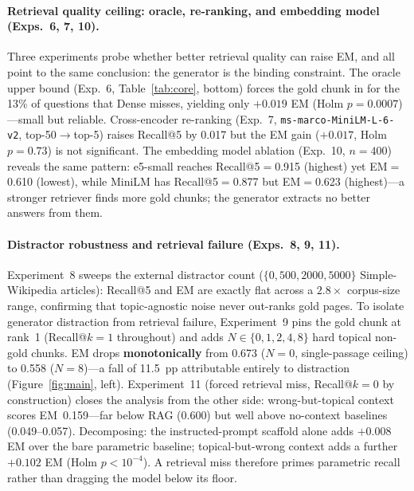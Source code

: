 \documentclass{article}
\begin{document}
\paragraph{Retrieval quality ceiling: oracle, re-ranking, and embedding model (Exps.\ 6, 7, 10).}
Three experiments probe whether better retrieval quality can raise EM,
and all point to the same conclusion: the generator is the binding
constraint.
The oracle upper bound (Exp.~6, Table~\ref{tab:core}, bottom) forces the
gold chunk in for the 13\% of questions that Dense misses, yielding
only $+0.019$ EM (Holm $p\!=\!0.0007$)---small but reliable.
Cross-encoder re-ranking (Exp.~7, \texttt{ms-marco-MiniLM-L-6-v2},
top-50$\to$top-5) raises Recall@5 by 0.017 but the EM gain ($+0.017$,
Holm $p\!=\!0.73$) is not significant.
The embedding model ablation (Exp.~10, $n\!=\!400$) reveals the same
pattern: e5-small reaches Recall@5$\!=\!$0.915 (highest) yet
EM$\!=\!$0.610 (lowest), while MiniLM has Recall@5$\!=\!$0.877 but
EM$\!=\!$0.623 (highest)---a stronger retriever finds more gold chunks;
the generator extracts no better answers from them.

\paragraph{Distractor robustness and retrieval failure (Exps.\ 8, 9, 11).}
Experiment~8 sweeps the external distractor count
($\{0, 500, 2000, 5000\}$ Simple-Wikipedia articles): Recall@5 and EM
are exactly flat across a $2.8\times$ corpus-size range, confirming
that topic-agnostic noise never out-ranks gold pages.
To isolate generator distraction from retrieval failure, Experiment~9
pins the gold chunk at rank~1 (Recall@$k\!=\!1$ throughout) and adds
$N\in\{0,1,2,4,8\}$ hard topical non-gold chunks.
EM drops \textbf{monotonically} from 0.673 ($N\!=\!0$, single-passage
ceiling) to 0.558 ($N\!=\!8$)---a fall of 11.5~pp attributable entirely
to distraction (Figure~\ref{fig:main}, left).
Experiment~11 (forced retrieval miss, Recall@$k\!=\!0$ by construction)
closes the analysis from the other side: wrong-but-topical context
scores EM~0.159---far below RAG (0.600) but well above no-context
baselines (0.049--0.057).
Decomposing: the instructed-prompt scaffold alone adds $+0.008$ EM over
the bare parametric baseline; topical-but-wrong context adds a further
$+0.102$ EM (Holm $p\!<\!10^{-4}$).
A retrieval miss therefore primes parametric recall rather than dragging
the model below its floor.
\end{document}
